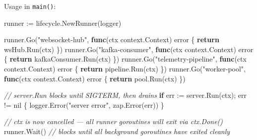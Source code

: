 \documentclass[
]{article}
\newenvironment{Shaded}{}{}
\newcommand{\CommentTok}[1]{\textcolor[rgb]{0.38,0.63,0.69}{\textit{#1}}}
\newcommand{\ControlFlowTok}[1]{\textcolor[rgb]{0.00,0.44,0.13}{\textbf{#1}}}
\newcommand{\DataTypeTok}[1]{\textcolor[rgb]{0.56,0.13,0.00}{#1}}
\newcommand{\KeywordTok}[1]{\textcolor[rgb]{0.00,0.44,0.13}{\textbf{#1}}}
\newcommand{\NormalTok}[1]{#1}
\newcommand{\OperatorTok}[1]{\textcolor[rgb]{0.40,0.40,0.40}{#1}}
\newcommand{\OtherTok}[1]{\textcolor[rgb]{0.00,0.44,0.13}{#1}}
\newcommand{\StringTok}[1]{\textcolor[rgb]{0.25,0.44,0.63}{#1}}
\begin{document}
Usage in \texttt{main()}:

\begin{Shaded}
\begin{Highlighting}[]
\NormalTok{runner }\OperatorTok{:=}\NormalTok{ lifecycle}\OperatorTok{.}\NormalTok{NewRunner}\OperatorTok{(}\NormalTok{logger}\OperatorTok{)}

\NormalTok{runner}\OperatorTok{.}\NormalTok{Go}\OperatorTok{(}\StringTok{"websocket{-}hub"}\OperatorTok{,}        \KeywordTok{func}\OperatorTok{(}\NormalTok{ctx context}\OperatorTok{.}\NormalTok{Context}\OperatorTok{)} \DataTypeTok{error} \OperatorTok{\{} \ControlFlowTok{return}\NormalTok{ wsHub}\OperatorTok{.}\NormalTok{Run}\OperatorTok{(}\NormalTok{ctx}\OperatorTok{)} \OperatorTok{\})}
\NormalTok{runner}\OperatorTok{.}\NormalTok{Go}\OperatorTok{(}\StringTok{"kafka{-}consumer"}\OperatorTok{,}       \KeywordTok{func}\OperatorTok{(}\NormalTok{ctx context}\OperatorTok{.}\NormalTok{Context}\OperatorTok{)} \DataTypeTok{error} \OperatorTok{\{} \ControlFlowTok{return}\NormalTok{ kafkaConsumer}\OperatorTok{.}\NormalTok{Run}\OperatorTok{(}\NormalTok{ctx}\OperatorTok{)} \OperatorTok{\})}
\NormalTok{runner}\OperatorTok{.}\NormalTok{Go}\OperatorTok{(}\StringTok{"telemetry{-}pipeline"}\OperatorTok{,}   \KeywordTok{func}\OperatorTok{(}\NormalTok{ctx context}\OperatorTok{.}\NormalTok{Context}\OperatorTok{)} \DataTypeTok{error} \OperatorTok{\{} \ControlFlowTok{return}\NormalTok{ pipeline}\OperatorTok{.}\NormalTok{Run}\OperatorTok{(}\NormalTok{ctx}\OperatorTok{)} \OperatorTok{\})}
\NormalTok{runner}\OperatorTok{.}\NormalTok{Go}\OperatorTok{(}\StringTok{"worker{-}pool"}\OperatorTok{,}          \KeywordTok{func}\OperatorTok{(}\NormalTok{ctx context}\OperatorTok{.}\NormalTok{Context}\OperatorTok{)} \DataTypeTok{error} \OperatorTok{\{} \ControlFlowTok{return}\NormalTok{ pool}\OperatorTok{.}\NormalTok{Run}\OperatorTok{(}\NormalTok{ctx}\OperatorTok{)} \OperatorTok{\})}

\CommentTok{// server.Run blocks until SIGTERM, then drains}
\ControlFlowTok{if}\NormalTok{ err }\OperatorTok{:=}\NormalTok{ server}\OperatorTok{.}\NormalTok{Run}\OperatorTok{(}\NormalTok{ctx}\OperatorTok{);}\NormalTok{ err }\OperatorTok{!=} \OtherTok{nil} \OperatorTok{\{}
\NormalTok{    logger}\OperatorTok{.}\NormalTok{Error}\OperatorTok{(}\StringTok{"server error"}\OperatorTok{,}\NormalTok{ zap}\OperatorTok{.}\NormalTok{Error}\OperatorTok{(}\NormalTok{err}\OperatorTok{))}
\OperatorTok{\}}

\CommentTok{// ctx is now cancelled — all runner goroutines will exit via ctx.Done()}
\NormalTok{runner}\OperatorTok{.}\NormalTok{Wait}\OperatorTok{()} \CommentTok{// blocks until all background goroutines have exited cleanly}
\end{Highlighting}
\end{Shaded}
\end{document}
